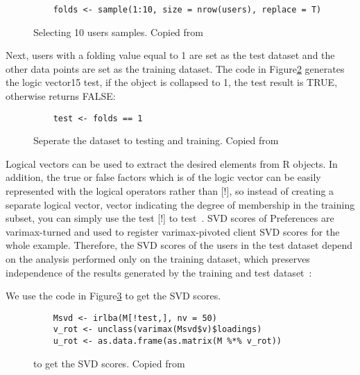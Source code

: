 \begin{figure}[htb]
\begin{footnotesize}
\begin{verbatim}
    folds <- sample(1:10, size = nrow(users), replace = T)
\end{verbatim}
\end{footnotesize}
\caption{Selecting 10 users samples. Copied from~\cite{hid515-12}}
\label{F:select}
\end{figure}


Next, users with a folding value equal to 1 are set as the 
test dataset and the other data points are set as the training 
dataset. The code in Figure\ref{F:logic} generates the 
logic vector15 test, if 
the object is collapsed to 1, the test result is TRUE, otherwise 
returns FALSE:

\begin{figure}[htb]
\begin{footnotesize}
\begin{verbatim}
    test <- folds == 1
\end{verbatim}
\end{footnotesize}
\caption{Seperate the dataset to testing and training. 
Copied from~\cite{hid515-12}}
\label{F:logic}
\end{figure}


Logical vectors can be used to extract the desired elements from R
 objects. In addition, the true or false factors
 which is of the logic vector can be easily represented with the 
logical operators rather than [!], 
so instead of creating a separate 
logical vector, vector indicating the degree of membership in the 
training subset, you can simply use the test [!] to 
test~\cite{hid515-12}. SVD scores of 
Preferences are varimax-turned and used to register varimax-pivoted
client SVD scores for the whole example.
Therefore, the SVD scores of the users in the test dataset depend
 on the analysis performed only on the training dataset, which 
preserves independence of the results generated by the 
training and test dataset~\cite{hid515-12}:

We use the code in Figure\ref{F:scores} to get the SVD scores.

\begin{figure}[htb]
\begin{footnotesize}
\begin{verbatim}
    Msvd <- irlba(M[!test,], nv = 50)
    v_rot <- unclass(varimax(Msvd$v)$loadings)
    u_rot <- as.data.frame(as.matrix(M %*% v_rot))
\end{verbatim}
\end{footnotesize}
\caption{to get the SVD scores. Copied from~\cite{hid515-12}}
\label{F:scores}
\end{figure}


